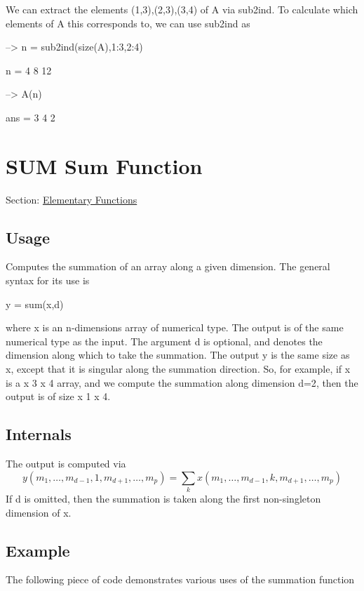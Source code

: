 We can extract the elements {\ttfamily (1,3),(2,3),(3,4)} of {\ttfamily A} via {\ttfamily sub2ind}. To calculate which elements of {\ttfamily A} this corresponds to, we can use {\ttfamily sub2ind} as


\begin{DoxyVerbInclude}
--> n = sub2ind(size(A),1:3,2:4)

n = 
  4  8 12 

--> A(n)

ans = 
 3 4 2 
\end{DoxyVerbInclude}
 \hypertarget{elementary_sum}{}\section{S\-U\-M Sum Function}\label{elementary_sum}
Section\-: \hyperlink{sec_elementary}{Elementary Functions} \hypertarget{vtkwidgets_vtkxyplotwidget_Usage}{}\subsection{Usage}\label{vtkwidgets_vtkxyplotwidget_Usage}
Computes the summation of an array along a given dimension. The general syntax for its use is \begin{DoxyVerb}  y = sum(x,d)
\end{DoxyVerb}
 where {\ttfamily x} is an {\ttfamily n}-\/dimensions array of numerical type. The output is of the same numerical type as the input. The argument {\ttfamily d} is optional, and denotes the dimension along which to take the summation. The output {\ttfamily y} is the same size as {\ttfamily x}, except that it is singular along the summation direction. So, for example, if {\ttfamily x} is a { x 3 x 4} array, and we compute the summation along dimension {\ttfamily d=2}, then the output is of size { x 1 x 4}. \hypertarget{transforms_svd_Function}{}\subsection{Internals}\label{transforms_svd_Function}
The output is computed via \[ y(m_1,\ldots,m_{d-1},1,m_{d+1},\ldots,m_{p}) = \sum_{k} x(m_1,\ldots,m_{d-1},k,m_{d+1},\ldots,m_{p}) \] If {\ttfamily d} is omitted, then the summation is taken along the first non-\/singleton dimension of {\ttfamily x}. \hypertarget{variables_struct_Example}{}\subsection{Example}\label{variables_struct_Example}
The following piece of code demonstrates various uses of the summation function


